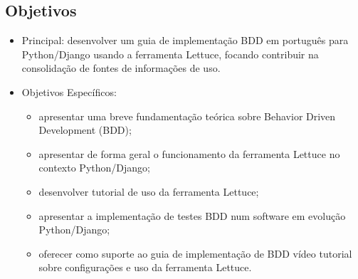 \documentclass{beamer}
\begin{document}
\subsection{Objetivos}
\begin{frame}
  \begin{itemize}
    \item Principal: desenvolver um guia de implementação BDD em português para Python/Django
usando a ferramenta Lettuce, focando contribuir na consolidação de fontes de informações
de uso.
    \item Objetivos Específicos:
        \begin{itemize}
            \item apresentar uma breve fundamentação teórica sobre Behavior Driven Development
(BDD);
            \item apresentar de forma geral o funcionamento da ferramenta Lettuce no contexto
Python/Django;
            \item desenvolver tutorial de uso da ferramenta Lettuce;
            \item apresentar a implementação de testes BDD num software em evolução Python/Django;
            \item oferecer como suporte ao guia de implementação de BDD vídeo tutorial sobre
configurações e uso da ferramenta Lettuce.
        \end{itemize}
  \end{itemize}
\end{frame}
\end{document}
